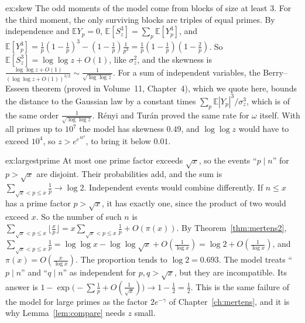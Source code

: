 \begin{solution}{ex:skew}
\idea The odd moments of the model come from blocks of size at least $3$. For the third moment, the only surviving blocks are triples of equal primes.
\writeup By independence and $\mathbb E Y_p=0$, $\mathbb E[S_z^3]=\sum_p\mathbb E[Y_p^3]$, and $\mathbb E[Y_p^3]=\frac1p(1-\frac1p)^3-(1-\frac1p)\frac1{p^3}=\frac1p(1-\frac1p)(1-\frac2p)$. So $\mathbb E[S_z^3]=\log\log z+O(1)$, like $\sigma_z^2$,
and the skewness is $\frac{\log\log z+O(1)}{(\log\log z+O(1))^{3/2}}\sim\frac1{\sqrt{\log\log z}}$. For a sum of independent variables, the Berry--Esseen theorem (proved in Volume~11, Chapter~4), which we quote here, bounds the distance to the Gaussian law by a constant times $\sum_p\mathbb E|Y_p|^3/\sigma_z^3$, which is of the same order $\frac1{\sqrt{\log\log z}}$. Rényi and Turán proved the same rate for $\omega$ itself. With all primes up to $10^7$
the model has skewness $0.49$, and $\log\log z$ would have to exceed $10^4$, so $z>e^{e^{10^4}}$, to bring it below $0.01$.
\end{solution}

\begin{solution}{ex:largestprime}
\idea At most one prime factor exceeds $\sqrt x$, so the events ``$p\mid n$'' for $p>\sqrt x$ are disjoint. Their probabilities add, and the sum is $\sum_{\sqrt x<p\le x}\frac1p\to\log2$. Independent events would combine differently.
\writeup If $n\le x$ has a prime factor $p>\sqrt x$, it has exactly one, since the product of two would exceed $x$. So the number of such $n$ is $\sum_{\sqrt x<p\le x}\lfloor\frac xp\rfloor=x\sum_{\sqrt x<p\le x}\frac1p+O(\pi(x))$.
By Theorem~\ref{thm:mertens2}, $\sum_{\sqrt x<p\le x}\frac1p=\log\log x-\log\log\sqrt x+O(\frac1{\log x})=\log2+O(\frac1{\log x})$, and $\pi(x)=O(\frac x{\log x})$. The proportion tends to $\log2=0.693$. The model treats ``$p\mid n$'' and ``$q\mid n$'' as independent for $p,q>\sqrt x$, but they are
incompatible. Its answer is $1-\exp\bigl(-\sum\frac1p+O(\frac1{\sqrt x})\bigr)\to1-\frac12=\frac12$. This is the same failure of the model for large primes as the factor $2e^{-\gamma}$ of Chapter~\ref{ch:mertens}, and it is why Lemma~\ref{lem:compare} needs $z$ small.
\end{solution}

